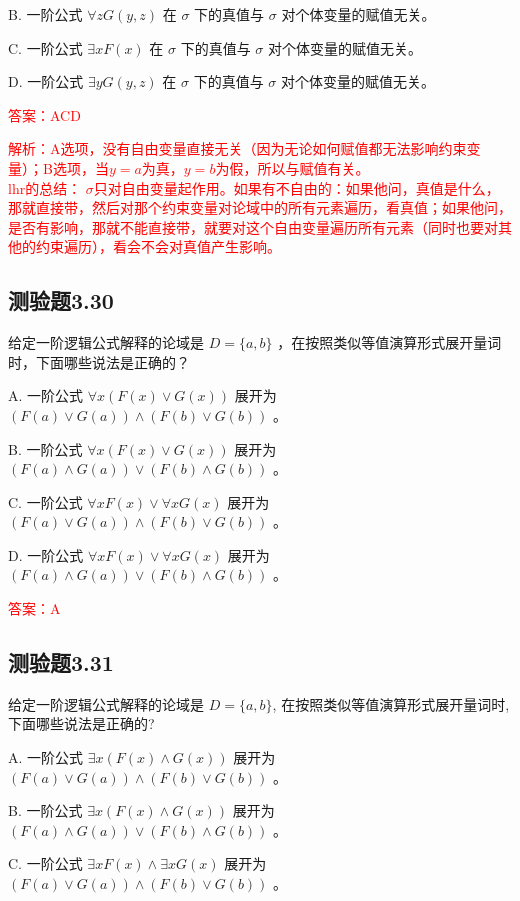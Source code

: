\documentclass[UTF8, heading=true]{ctexart}
\begin{document}
B. 
一阶公式 $\forall z G(y, z)$ 在 $\sigma$ 下的真值与 $\sigma$ 对个体变量的赋值无关。

C. 
一阶公式 $\exists x F(x)$ 在 $\sigma$ 下的真值与 $\sigma$ 对个体变量的赋值无关。

D. 
一阶公式 $\exists y G(y, z)$ 在 $\sigma$ 下的真值与 $\sigma$ 对个体变量的赋值无关。

\textcolor{red}{答案：ACD}

\textcolor{red}{解析：A选项，没有自由变量直接无关（因为无论如何赋值都无法影响约束变量）；B选项，当$y=a$为真，$y=b$为假，所以与赋值有关。\\ \indent lhr的总结：
$\sigma$只对自由变量起作用。如果有不自由的：如果他问，真值是什么，那就直接带，然后对那个约束变量对论域中的所有元素遍历，看真值；如果他问，是否有影响，那就不能直接带，就要对这个自由变量遍历所有元素（同时也要对其他的约束遍历），看会不会对真值产生影响。}

\subsection{测验题3.30}

给定一阶逻辑公式解释的论域是 $D=\{a, b\}$ ，在按照类似等值演算形式展开量词时，下面哪些说法是正确的？

A. 一阶公式 $\forall x(F(x) \vee G(x))$ 展开为 $(F(a) \vee G(a)) \wedge(F(b) \vee G(b))$ 。

B. 一阶公式 $\forall x(F(x) \vee G(x))$ 展开为 $(F(a) \wedge G(a)) \vee(F(b) \wedge G(b))$ 。

C. 一阶公式 $\forall x F(x) \vee \forall x G(x)$ 展开为 $(F(a) \vee G(a)) \wedge(F(b) \vee G(b))$ 。

D. 一阶公式 $\forall x F(x) \vee \forall x G(x)$ 展开为 $(F(a) \wedge G(a)) \vee(F(b) \wedge G(b))$ 。

\textcolor{red}{答案：A}

\subsection{测验题3.31}

给定一阶逻辑公式解释的论域是 $D=\{a, b\}$, 在按照类似等值演算形式展开量词时, 下面哪些说法是正确的?

A. 一阶公式 $\exists x(F(x) \wedge G(x))$ 展开为 $(F(a) \vee G(a)) \wedge(F(b) \vee G(b))$ 。

B. 一阶公式 $\exists x(F(x) \wedge G(x))$ 展开为 $(F(a) \wedge G(a)) \vee(F(b) \wedge G(b))$ 。

C. 一阶公式 $\exists x F(x) \wedge \exists x G(x)$ 展开为 $(F(a) \vee G(a)) \wedge(F(b) \vee G(b))$ 。
\end{document}
